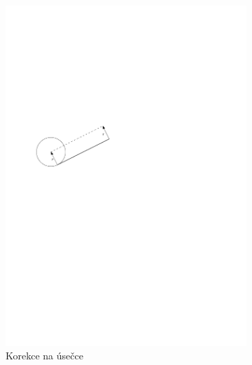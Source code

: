 			\begin{figure}[h]
				\centering
					\begin{subfigure}[b]{0.30\textwidth}
						\centering
						\includegraphics[width=\textwidth]{img/korekce-lin-jedn.pdf}
						\caption{Korekce na úsečce}
					\end{subfigure}
					~~~~~~~~~~~~~~~~~~~
					\begin{subfigure}[b]{0.25\textwidth}
						\centering

\end{subfigure}
\end{figure}
